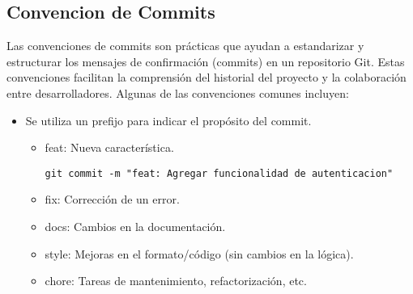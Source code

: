 \subsection{Convencion de Commits}

Las convenciones de commits son prácticas que ayudan a estandarizar y estructurar los mensajes de 
confirmación (commits) en un repositorio Git. Estas convenciones facilitan la comprensión del 
historial del proyecto y la colaboración entre desarrolladores. 
Algunas de las convenciones comunes incluyen:\\

\begin{itemize}
    \item Se utiliza un prefijo para indicar el propósito del commit. 
    \begin{itemize}
        \item feat: Nueva característica.
        \begin{lstlisting}[style=bashstyle]
            git commit -m "feat: Agregar funcionalidad de autenticacion"
        \end{lstlisting}
        \item fix: Corrección de un error.
        \item docs: Cambios en la documentación.
        \item style: Mejoras en el formato/código (sin cambios en la lógica).
        \item chore: Tareas de mantenimiento, refactorización, etc.
    \end{itemize}
\end{itemize}